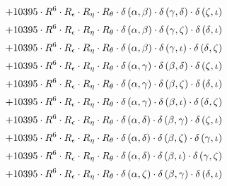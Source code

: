 \begin{subequations}
\begin{gather}
 \\[0.2em] \notag 		 + 10395 \cdot R^{6} \cdot R_{\epsilon{}} \cdot R_{\eta{}} \cdot R_{\theta{}} \cdot \delta{}\left(\alpha{}, \beta{}\right) \cdot \delta{}\left(\gamma{}, \delta{}\right) \cdot \delta{}\left(\zeta{}, \iota{}\right) 
 \\[0.2em] \notag 		 + 10395 \cdot R^{6} \cdot R_{\epsilon{}} \cdot R_{\eta{}} \cdot R_{\theta{}} \cdot \delta{}\left(\alpha{}, \beta{}\right) \cdot \delta{}\left(\gamma{}, \zeta{}\right) \cdot \delta{}\left(\delta{}, \iota{}\right) 
 \\[0.2em] \notag 		 + 10395 \cdot R^{6} \cdot R_{\epsilon{}} \cdot R_{\eta{}} \cdot R_{\theta{}} \cdot \delta{}\left(\alpha{}, \beta{}\right) \cdot \delta{}\left(\gamma{}, \iota{}\right) \cdot \delta{}\left(\delta{}, \zeta{}\right) 
 \\[0.2em] \notag 		 + 10395 \cdot R^{6} \cdot R_{\epsilon{}} \cdot R_{\eta{}} \cdot R_{\theta{}} \cdot \delta{}\left(\alpha{}, \gamma{}\right) \cdot \delta{}\left(\beta{}, \delta{}\right) \cdot \delta{}\left(\zeta{}, \iota{}\right) 
 \\[0.2em] \notag 		 + 10395 \cdot R^{6} \cdot R_{\epsilon{}} \cdot R_{\eta{}} \cdot R_{\theta{}} \cdot \delta{}\left(\alpha{}, \gamma{}\right) \cdot \delta{}\left(\beta{}, \zeta{}\right) \cdot \delta{}\left(\delta{}, \iota{}\right) 
 \\[0.2em] \notag 		 + 10395 \cdot R^{6} \cdot R_{\epsilon{}} \cdot R_{\eta{}} \cdot R_{\theta{}} \cdot \delta{}\left(\alpha{}, \gamma{}\right) \cdot \delta{}\left(\beta{}, \iota{}\right) \cdot \delta{}\left(\delta{}, \zeta{}\right) 
 \\[0.2em] \notag 		 + 10395 \cdot R^{6} \cdot R_{\epsilon{}} \cdot R_{\eta{}} \cdot R_{\theta{}} \cdot \delta{}\left(\alpha{}, \delta{}\right) \cdot \delta{}\left(\beta{}, \gamma{}\right) \cdot \delta{}\left(\zeta{}, \iota{}\right) 
 \\[0.2em] \notag 		 + 10395 \cdot R^{6} \cdot R_{\epsilon{}} \cdot R_{\eta{}} \cdot R_{\theta{}} \cdot \delta{}\left(\alpha{}, \delta{}\right) \cdot \delta{}\left(\beta{}, \zeta{}\right) \cdot \delta{}\left(\gamma{}, \iota{}\right) 
 \\[0.2em] \notag 		 + 10395 \cdot R^{6} \cdot R_{\epsilon{}} \cdot R_{\eta{}} \cdot R_{\theta{}} \cdot \delta{}\left(\alpha{}, \delta{}\right) \cdot \delta{}\left(\beta{}, \iota{}\right) \cdot \delta{}\left(\gamma{}, \zeta{}\right) 
 \\[0.2em] \notag 		 + 10395 \cdot R^{6} \cdot R_{\epsilon{}} \cdot R_{\eta{}} \cdot R_{\theta{}} \cdot \delta{}\left(\alpha{}, \zeta{}\right) \cdot \delta{}\left(\beta{}, \gamma{}\right) \cdot \delta{}\left(\delta{}, \iota{}\right) 

\end{gather}
\end{subequations}
